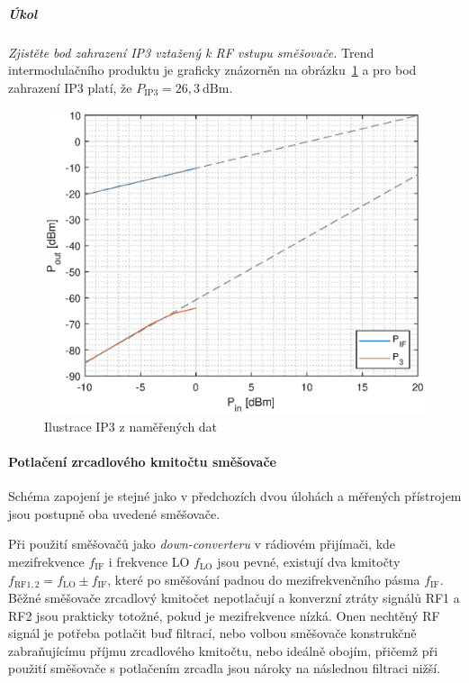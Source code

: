 \documentclass[11pt,a4paper]{article}
\begin{document}
\subparagraph*{Úkol} \emph{Zjistěte bod zahrazení IP3 vztažený k RF vstupu směšovače.} Trend intermodulačního produktu je graficky znázorněn na obrázku~\ref{fig:task2-ip3} a pro bod zahrazení IP3 platí, že $P_{\mathrm{IP3}} = 26,3~\mathrm{dBm}$.
\begin{figure}[!ht]
    \centering
    \includegraphics[width=.6\textwidth]{src/task2-ip3.eps}
    \caption{Ilustrace IP3 z naměřených dat}
    \label{fig:task2-ip3}
\end{figure}

\paragraph*{Potlačení zrcadlového kmitočtu směšovače} Schéma zapojení je stejné jako v předchozích dvou úlohách a měřených přístrojem jsou postupně oba uvedené směšovače.

Při použití směšovačů jako \emph{down-converteru} v rádiovém přijímači, kde mezifrekvence $f_{\mathrm{IF}}$ i frekvence LO $f_{\mathrm{LO}}$ jsou pevné, existují dva kmitočty $f_{\mathrm{RF1,2}} = f_{\mathrm{LO}}\pm f_{\mathrm{IF}}$, které po směšování padnou do mezifrekvenčního pásma $f_{\mathrm{IF}}$. Běžné směšovače zrcadlový kmitočet nepotlačují a konverzní ztráty signálů RF1 a RF2 jsou prakticky totožné, pokud je mezifrekvence nízká. Onen nechtěný RF signál je potřeba potlačit buď filtrací, nebo volbou směšovače konstrukčně zabraňujícímu příjmu zrcadlového kmitočtu, nebo ideálně obojím, přičemž při použití směšovače s potlačením zrcadla jsou nároky na následnou filtraci nižší.
\end{document}
